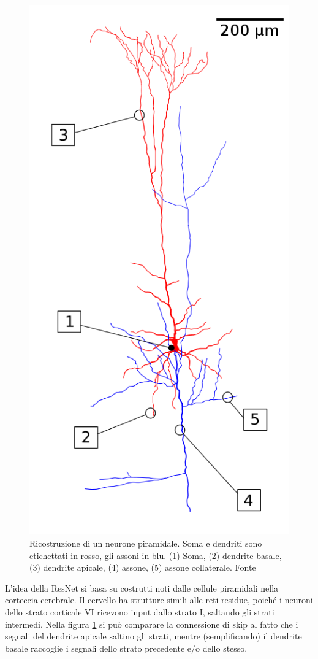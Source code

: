\begin{figure}[!htb]
	\includegraphics[scale=0.25]{images/resnet2.png}
	\caption{Ricostruzione di un neurone piramidale. Soma e dendriti sono etichettati in rosso, gli assoni in blu. (1) Soma, (2) dendrite basale, (3) dendrite apicale, (4) assone, (5) assone collaterale. Fonte \cite{resnetWiki}}
	\label{fig:resnet-neurone}
	\endminipage\hfill
\end{figure}

\par L'idea della ResNet si basa su costrutti noti dalle cellule piramidali nella corteccia cerebrale. Il cervello ha strutture simili alle reti residue, poiché i neuroni dello strato corticale VI ricevono input dallo strato I, saltando gli strati intermedi. Nella figura \ref{fig:resnet-neurone} si può comparare la connessione di skip al fatto che i segnali del dendrite apicale saltino gli strati, mentre (semplificando) il dendrite basale raccoglie i segnali dello strato precedente e/o dello stesso. 

